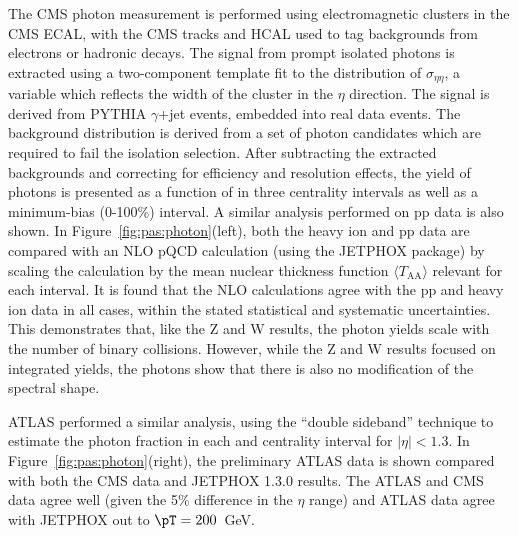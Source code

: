 The CMS photon measurement is performed using electromagnetic clusters in the CMS ECAL, with the
CMS tracks and HCAL used to tag backgrounds from electrons or hadronic decays.
The signal from prompt isolated photons is extracted using a two-component template fit to
the distribution of $\sigma_{\eta\eta}$, a variable which reflects the width of the cluster
in the $\eta$ direction.  The signal is derived from PYTHIA $\gamma$+jet events, embedded
into real \PbPb data events.  The background distribution is derived from a set of photon
candidates which are required to fail the isolation selection.
After subtracting the extracted backgrounds and correcting for efficiency and resolution
effects, the yield of photons is presented as a function of \pT in three centrality intervals
as well as a minimum-bias (0-100\%) interval.  A similar analysis performed on pp data is
also shown.
In Figure~\ref{fig:pas:photon}(left),
both the heavy ion and pp data are compared with an NLO pQCD calculation (using the
JETPHOX package) by scaling the calculation by the mean nuclear
thickness function $\langle T_{\mathrm{AA}} \rangle$ relevant for each interval.
It is found that the NLO calculations agree with the pp and heavy ion data in all cases, within
the stated statistical and systematic uncertainties.  This demonstrates that, like the
Z and W results, the photon yields scale with the number of binary collisions.
However, while the Z and W results focused on integrated yields, the photons show that
there is also no modification of the spectral shape.

ATLAS performed a similar analysis, using the ``double sideband'' technique to estimate the
photon fraction in each \pT and centrality interval for $|\eta|<1.3$.
In Figure~\ref{fig:pas:photon}(right), the preliminary ATLAS data is shown compared with both
the CMS data and JETPHOX 1.3.0 results.  The ATLAS and CMS data agree well (given the 5\%
difference in the $\eta$ range) and ATLAS data agree with JETPHOX out to $\pT = 200$~GeV.

